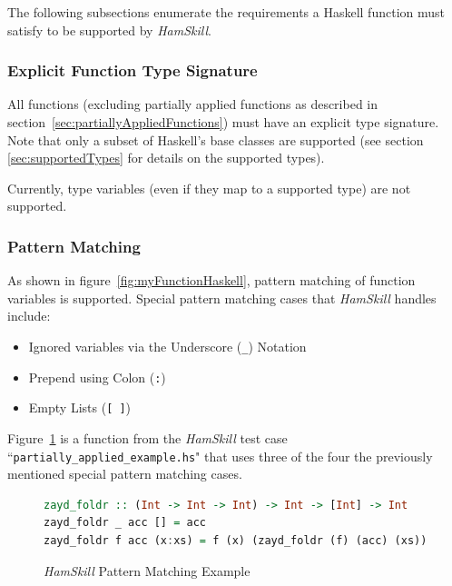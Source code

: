 \documentclass{report}
\begin{document}
The following subsections enumerate the requirements a Haskell function must satisfy to be supported by \textit{HamSkill}.

\subsubsection{Explicit Function Type Signature}\label{sec:explicitTypeSignature}

All functions (excluding partially applied functions as described in section~\ref{sec:partiallyAppliedFunctions}) must have an explicit type signature.  Note that only a subset of Haskell's base classes are supported (see section \ref{sec:supportedTypes} for details on the supported types).  

Currently, type variables (even if they map to a supported type) are not supported.

\subsubsection{Pattern Matching}\label{sec:supportedPatternMatching}

As shown in figure~\ref{fig:myFunctionHaskell}, pattern matching of function variables is supported.  Special pattern matching cases that \textit{HamSkill} handles include:

\begin{itemize}

\item Ignored variables via the Underscore (\texttt{\_}) Notation

\item Prepend using Colon (\texttt{:})

\item Empty Lists (\texttt{[ ]})

\end{itemize}

Figure~\ref{fig:functionZaydFoldr} is a function from the \textit{HamSkill} test case ``\texttt{partially\_applied\_example.hs}" that uses three of the four the previously mentioned special pattern matching cases.

\begin{figure}[H]
\begin{mdframed}
\begin{lstlisting}[basicstyle=\small, language=Haskell]
zayd_foldr :: (Int -> Int -> Int) -> Int -> [Int] -> Int
zayd_foldr _ acc [] = acc
zayd_foldr f acc (x:xs) = f (x) (zayd_foldr (f) (acc) (xs))
\end{lstlisting}
\end{mdframed}
\caption{\textit{HamSkill} Pattern Matching Example}\label{fig:functionZaydFoldr}
\end{figure}
\end{document}
